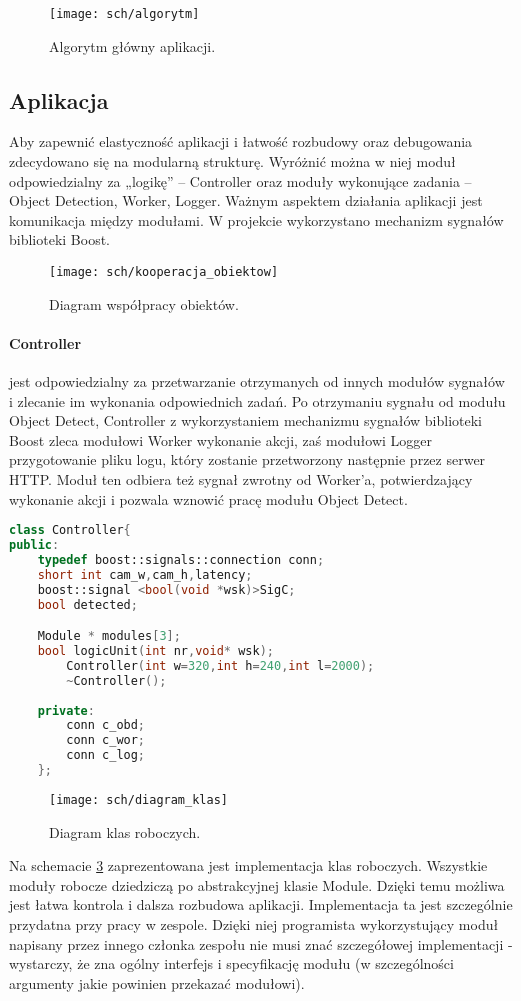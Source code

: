 \begin{figure}[bth]
\centering
{\texttt{[image: sch/algorytm]}}
\caption[Algorytm główny aplikacji.]{Algorytm główny aplikacji.}
\label{fig:algorytm}
\end{figure}
\subsection{Aplikacja}
Aby zapewnić elastyczność aplikacji i łatwość rozbudowy oraz debugowania zdecydowano się na modularną strukturę. Wyróżnić można w niej moduł odpowiedzialny za „logikę” – Controller oraz moduły wykonujące zadania – Object Detection, Worker, Logger.
Ważnym aspektem działania aplikacji jest komunikacja między modułami. W projekcie wykorzystano mechanizm sygnałów biblioteki Boost.
\begin{figure}[bth]
\centering
{\texttt{[image: sch/kooperacja\_obiektow]}}
\caption[Diagram współpracy obiektów]{Diagram współpracy obiektów.}
\label{fig:koooperacja}
\end{figure}

\paragraph{Controller} jest odpowiedzialny za przetwarzanie otrzymanych od innych modułów sygnałów i zlecanie im wykonania odpowiednich zadań. Po otrzymaniu sygnału od modułu Object Detect, Controller z wykorzystaniem mechanizmu sygnałów biblioteki Boost zleca modułowi Worker wykonanie akcji, zaś modułowi Logger  przygotowanie pliku logu, który zostanie przetworzony następnie przez serwer HTTP.
Moduł ten odbiera też sygnał zwrotny od Worker’a, potwierdzający wykonanie akcji i pozwala wznowić pracę modułu Object Detect.


\begin{lstlisting}[caption = {Klasa Controller.}, label=Controller, language=C++]
class Controller{
public:
	typedef boost::signals::connection conn;
	short int cam_w,cam_h,latency;
	boost::signal <bool(void *wsk)>SigC;
	bool detected;

	Module * modules[3];
	bool logicUnit(int nr,void* wsk);
		Controller(int w=320,int h=240,int l=2000);
		~Controller();
	
	private:
		conn c_obd;
		conn c_wor;
		conn c_log;
	};     
\end{lstlisting}


\begin{figure}[bth]
\centering
{\texttt{[image: sch/diagram\_klas]}}
\caption[Diagram klas roboczych]{Diagram klas roboczych.}
\label{fig:dziedziczenie}
\end{figure}
Na schemacie \ref{fig:dziedziczenie} zaprezentowana jest implementacja klas roboczych. Wszystkie moduły robocze dziedziczą po abstrakcyjnej klasie Module. Dzięki temu możliwa jest łatwa kontrola i dalsza rozbudowa aplikacji. Implementacja ta jest szczególnie przydatna przy pracy w zespole. Dzięki niej programista wykorzystujący moduł napisany przez innego członka zespołu nie musi znać szczegółowej implementacji - wystarczy, że zna ogólny interfejs i specyfikację modułu (w szczególności argumenty jakie powinien przekazać modułowi).

